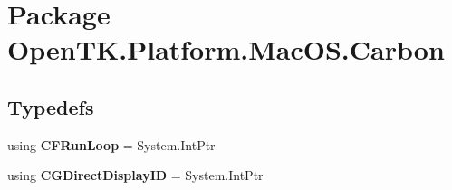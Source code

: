 \hypertarget{namespace_open_t_k_1_1_platform_1_1_mac_o_s_1_1_carbon}{\section{Package Open\-T\-K.\-Platform.\-Mac\-O\-S.\-Carbon}
\label{namespace_open_t_k_1_1_platform_1_1_mac_o_s_1_1_carbon}
}
\subsection*{Typedefs}
\begin{DoxyCompactItemize}
\item 
\hypertarget{namespace_open_t_k_1_1_platform_1_1_mac_o_s_1_1_carbon_a62fbd86809b36a4e19583c10a4a5e54e}{using {\bfseries C\-F\-Run\-Loop} = System.\-Int\-Ptr}\label{namespace_open_t_k_1_1_platform_1_1_mac_o_s_1_1_carbon_a62fbd86809b36a4e19583c10a4a5e54e}

\item 
\hypertarget{namespace_open_t_k_1_1_platform_1_1_mac_o_s_1_1_carbon_a097cc174d0d5a5f3da0c6174518aca4f}{using {\bfseries C\-G\-Direct\-Display\-I\-D} = System.\-Int\-Ptr}\label{namespace_open_t_k_1_1_platform_1_1_mac_o_s_1_1_carbon_a097cc174d0d5a5f3da0c6174518aca4f}

\end{DoxyCompactItemize}
